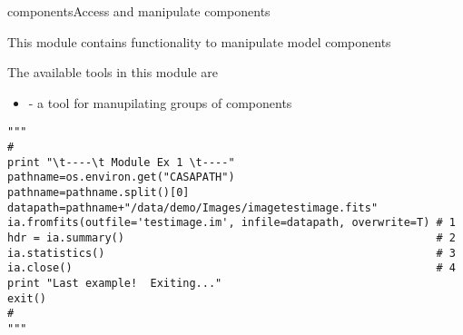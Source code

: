 
\begin{ahmodule}{components}{Access and manipulate components}


\bigskip
{} 

This module contains functionality to manipulate model components 

\noindent The available tools in this module are

\begin{itemize}

\item {} - a tool for manupilating groups of components 

\end{itemize}


\begin{ahexample}


\begin{verbatim}
"""
#
print "\t----\t Module Ex 1 \t----"
pathname=os.environ.get("CASAPATH")
pathname=pathname.split()[0]
datapath=pathname+"/data/demo/Images/imagetestimage.fits"
ia.fromfits(outfile='testimage.im', infile=datapath, overwrite=T) # 1
hdr = ia.summary()                                                # 2
ia.statistics()                                                   # 3
ia.close()                                                        # 4
print "Last example!  Exiting..."
exit()
#
"""
\end{verbatim}

\end{ahexample}


\ahobjs{}
\ahfuncs{}




\end{ahmodule}
